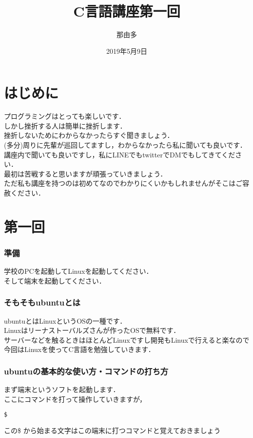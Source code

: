 \documentclass[a4j,titlepage,dvipdfmx]{jsarticle}   %
\title{C言語講座第一回}
\author{那由多}
\date{2019年5月9日}
\begin{document}
\maketitle
\part{はじめに}
{\Large プログラミングはとっても楽しいです．\\}
しかし挫折する人は簡単に挫折します．\\
挫折しないためにわからなかったらすぐ聞きましょう．\\
(多分)周りに先輩が巡回してますし，わからなかったら私に聞いても良いです．\\
講座内で聞いても良いですし，私にLINEでもtwitterでDMでもしてきてください．\\
最初は苦戦すると思いますが頑張っていきましょう．\\
ただ私も講座を持つのは初めてなのでわかりにくいかもしれませんがそこはご容赦ください．\\
\part{第一回}
\section{準備}
学校のPCを起動してLinuxを起動してください．\\
そして端末を起動してください．\\

\section{そもそもubuntuとは}
ubuntuとはLinuxというOSの一種です．\\
Linuxはリーナストーバルズさんが作ったOSで無料です．\\
サーバーなどを触るときはほとんどLinuxですし開発もLinuxで行えると楽なので今回はLinuxを使ってC言語を勉強していきます．\\
\section{ubuntuの基本的な使い方・コマンドの打ち方}
まず端末というソフトを起動します．\\
ここにコマンドを打って操作していきますが，
\begin{lstlisting}
$
\end{lstlisting}
この\$ から始まる文字はこの端末に打つコマンドと覚えておきましょう
\end{document}
